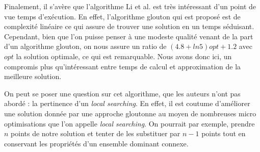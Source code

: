 Finalement, il s'avère que l'algorithme Li et al. est très intéressant d'un point de vue temps d'exécution. En effet, l'algorithme glouton qui est proposé est de complexité linéaire ce qui assure de trouver une solution en un temps séduisant. Cependant, bien que l'on puisse penser à une modeste qualité venant de la part d'un algorithme glouton, on nous assure un ratio de $(4.8+ln5)opt+1.2$ avec $opt$ la solution optimale, ce qui est remarquable. Nous avons donc ici, un compromis plus qu'intéressant entre temps de calcul et approximation de la meilleure solution.

On peut se poser une question sur cet algorithme, que les auteurs n'ont pas abordé : la pertinence d'un \textit{local searching}. En effet, il est coutume d'améliorer une solution donnée par une approche gloutonne au moyen de nombreuses micro optimisations que l'on appelle \textit{local searching}. On pourrait par exemple, prendre $n$ points de notre solution et tenter de les substituer par $n-1$ points tout en conservant les propriétés d'un ensemble dominant connexe.